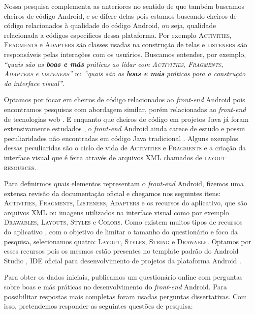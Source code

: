 Nossa pesquisa complementa as anteriores no sentido de que também buscamos cheiros de código Android, e se difere delas pois estamos buscando cheiros de código relacionados à qualidade do código Android, ou seja, qualidade relacionada a códigos específicos dessa plataforma. Por exemplo \textsc{Activities}, \textsc{Fragments} e \textsc{Adapters} são classes usadas na construção de telas e \textsc{listeners} são responsáveis pelas interações com os usuários. Buscamos entender, por exemplo, \textit{``quais são as \textbf{boas e más} práticas ao lidar com \textsc{Activities}, \textsc{Fragments}, \textsc{Adapters} e \textsc{listeners}''} ou \textit{``quais são as \textbf{boas e más} práticas para a construção da interface visual''}. 

Optamos por focar em cheiros de código relacionados ao \textit{front-end} Android pois encontramos pesquisas com abordagem similar, porém relacionadas ao \textit{front-end} de tecnologias web \cite{CSSCodeSmell, BB, FinavaroAniche2016}. E enquanto que cheiros de código em projetos Java já foram extensivamente estudados \cite{Riel, Refactoring:99, Martin:2008:CCH:1388398}, o \textit{front-end} Android ainda carece de estudo e possui peculiaridades não encontradas em código Java tradicional \cite{Mannan_Dig_Ahmed_Jensen_Abdullah_Almurshed}. Alguns exemplos dessas peculiaridas são o ciclo de vida de \textsc{Activities} e \textsc{Fragments} e a criação da interface visual que é feita através de arquivos XML chamados de \textsc{layout resources}.

Para definirmos quais elementos representam o \textit{front-end} Android, fizemos uma extensa revisão da documentação oficial \cite{AndroidDeveloperSite2016} e chegamos nos seguintes itens: \textsc{Activities}, \textsc{Fragments}, \textsc{Listeners}, \textsc{Adapters} e os recursos do aplicativo, que são arquivos XML ou imagens utilizados na interface visual como por exemplo \textsc{Drawables}, \textsc{Layouts}, \textsc{Styles} e \textsc{Colors}. Como existem muitos tipos de recursos do aplicativo \cite{AndroidResourcesOverview}, com o objetivo de limitar o tamanho do questionário e foco da pesquisa, selecionamos quatro: \textsc{Layout}, \textsc{Styles}, \textsc{String} e \textsc{Drawable}. Optamos por esses recursos pois os mesmos estão presentes no template padrão do Android Studio \cite{FirstApp2017}, IDE oficial para desenvolvimento de projetos da plataforma Android \cite{AndroidStudio}. 

Para obter os dados iniciais, publicamos um questionário online com perguntas sobre boas e más práticas no desenvolvimento do \textit{front-end} Android. Para possibilitar respostas mais completas foram usadas perguntas dissertativas. Com isso, pretendemos responder as seguintes questões de pesquisa: \\

